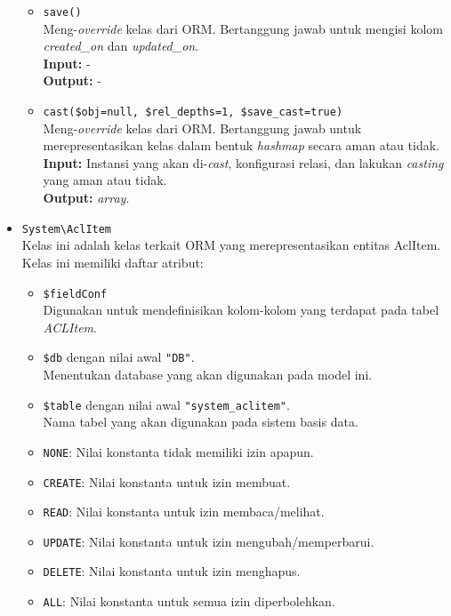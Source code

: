 \begin{itemize}
\begin{itemize}
                \item \texttt{save()}\\
                    Meng-\textit{override} kelas dari ORM. Bertanggung jawab
                    untuk mengisi kolom \textit{created\_on} dan
                    \textit{updated\_on}.\\
                    \textbf{Input:} -\\
                    \textbf{Output:} -
                
                \item \texttt{cast(\$obj=null, \$rel\_depths=1,
                \$save\_cast=true)}\\
                    Meng-\textit{override} kelas dari ORM. Bertanggung jawab
                    untuk merepresentasikan kelas dalam bentuk \textit{hashmap}
                    secara aman atau tidak. \\
                    \textbf{Input:} Instansi yang akan di-\textit{cast},
                        konfigurasi relasi, dan lakukan \textit{casting} yang
                        aman atau tidak.\\
                    \textbf{Output:} \textit{array}.
            \end{itemize}
            
        \item \texttt{System\textbackslash AclItem} \\
            Kelas ini adalah kelas terkait ORM yang merepresentasikan entitas
            AclItem. Kelas ini memiliki daftar atribut:
            \begin{itemize}
                \item \texttt{\$fieldConf} \\
                    Digunakan untuk mendefinisikan kolom-kolom yang terdapat
                    pada tabel \textit{ACLItem}.
                \item \texttt{\$db} dengan nilai awal \texttt{"DB"}. \\
                    Menentukan database yang akan digunakan pada model ini.
                \item \texttt{\$table} dengan nilai awal
                \texttt{"system\_aclitem"}. \\
                    Nama tabel yang akan digunakan pada sistem basis data. 
                \item \texttt{NONE}: Nilai konstanta tidak memiliki izin apapun.
                \item \texttt{CREATE}: Nilai konstanta untuk izin membuat.
                \item \texttt{READ}: Nilai konstanta untuk izin membaca/melihat.
                \item \texttt{UPDATE}: Nilai konstanta untuk izin
                mengubah/memperbarui.
                \item \texttt{DELETE}: Nilai konstanta untuk izin menghapus.
                \item \texttt{ALL}: Nilai konstanta untuk semua izin
                diperbolehkan.
            \end{itemize}
            

\end{itemize}
